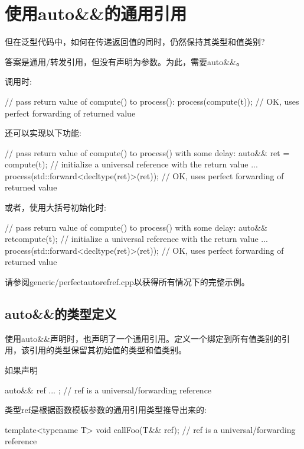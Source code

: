 \section{使用auto\&\&的通用引用}
但在泛型代码中，如何在传递返回值的同时，仍然保持其类型和值类别?

答案是通用/转发引用，但没有声明为参数。为此，需要auto\&\&。

调用时:

\begin{cppcode}
// pass return value of compute() to process():
process(compute(t)); // OK, uses perfect forwarding of returned value
\end{cppcode}

还可以实现以下功能:

\begin{cppcode}
// pass return value of compute() to process() with some delay:
auto&& ret = compute(t); // initialize a universal reference with the return value
...
process(std::forward<decltype(ret)>(ret)); // OK, uses perfect forwarding of returned value
\end{cppcode}

或者，使用大括号初始化时:

\begin{cppcode}
// pass return value of compute() to process() with some delay:
auto&& ret{compute(t)}; // initialize a universal reference with the return value
...
process(std::forward<decltype(ret)>(ret)); // OK, uses perfect forwarding of returned value
\end{cppcode}

请参阅generic/perfectautorefref.cpp以获得所有情况下的完整示例。

\subsection{auto\&\&的类型定义}

使用auto\&\&声明时，也声明了一个通用引用。定义一个绑定到所有值类别的引用，该引用的类型保留其初始值的类型和值类别。

如果声明

\begin{cppcode}
auto&& ref{ ... }; // ref is a universal/forwarding reference
\end{cppcode}

类型ref是根据函数模板参数的通用引用类型推导出来的:

\begin{cppcode}
template<typename T>
void callFoo(T&& ref); // ref is a universal/forwarding reference
\end{cppcode}

